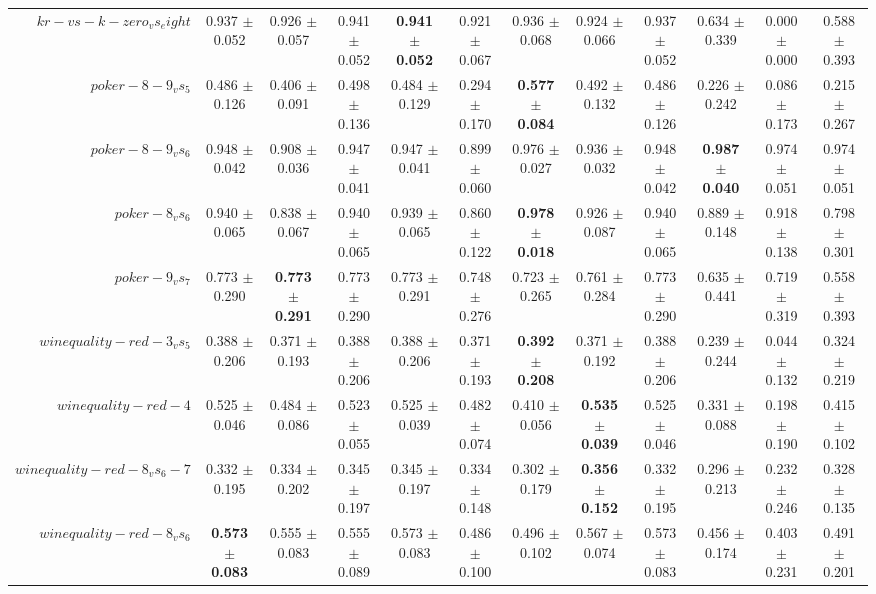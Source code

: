 \begin{table}[!ht]
{\begin{tabular}{r c c c c c c c c c c c}
$kr-vs-k-zero_vs_eight$ & 0.937 $\pm$ 0.052 & 0.926 $\pm$ 0.057 & 0.941 $\pm$ 0.052 & \textbf{0.941 $\pm$ 0.052} & 0.921 $\pm$ 0.067 & 0.936 $\pm$ 0.068 & 0.924 $\pm$ 0.066 & 0.937 $\pm$ 0.052 & 0.634 $\pm$ 0.339 & 0.000 $\pm$ 0.000 & 0.588 $\pm$ 0.393 \\
$poker-8-9_vs_5$ & 0.486 $\pm$ 0.126 & 0.406 $\pm$ 0.091 & 0.498 $\pm$ 0.136 & 0.484 $\pm$ 0.129 & 0.294 $\pm$ 0.170 & \textbf{0.577 $\pm$ 0.084} & 0.492 $\pm$ 0.132 & 0.486 $\pm$ 0.126 & 0.226 $\pm$ 0.242 & 0.086 $\pm$ 0.173 & 0.215 $\pm$ 0.267 \\
$poker-8-9_vs_6$ & 0.948 $\pm$ 0.042 & 0.908 $\pm$ 0.036 & 0.947 $\pm$ 0.041 & 0.947 $\pm$ 0.041 & 0.899 $\pm$ 0.060 & 0.976 $\pm$ 0.027 & 0.936 $\pm$ 0.032 & 0.948 $\pm$ 0.042 & \textbf{0.987 $\pm$ 0.040} & 0.974 $\pm$ 0.051 & 0.974 $\pm$ 0.051 \\
$poker-8_vs_6$ & 0.940 $\pm$ 0.065 & 0.838 $\pm$ 0.067 & 0.940 $\pm$ 0.065 & 0.939 $\pm$ 0.065 & 0.860 $\pm$ 0.122 & \textbf{0.978 $\pm$ 0.018} & 0.926 $\pm$ 0.087 & 0.940 $\pm$ 0.065 & 0.889 $\pm$ 0.148 & 0.918 $\pm$ 0.138 & 0.798 $\pm$ 0.301 \\
$poker-9_vs_7$ & 0.773 $\pm$ 0.290 & \textbf{0.773 $\pm$ 0.291} & 0.773 $\pm$ 0.290 & 0.773 $\pm$ 0.291 & 0.748 $\pm$ 0.276 & 0.723 $\pm$ 0.265 & 0.761 $\pm$ 0.284 & 0.773 $\pm$ 0.290 & 0.635 $\pm$ 0.441 & 0.719 $\pm$ 0.319 & 0.558 $\pm$ 0.393 \\
$winequality-red-3_vs_5$ & 0.388 $\pm$ 0.206 & 0.371 $\pm$ 0.193 & 0.388 $\pm$ 0.206 & 0.388 $\pm$ 0.206 & 0.371 $\pm$ 0.193 & \textbf{0.392 $\pm$ 0.208} & 0.371 $\pm$ 0.192 & 0.388 $\pm$ 0.206 & 0.239 $\pm$ 0.244 & 0.044 $\pm$ 0.132 & 0.324 $\pm$ 0.219 \\
$winequality-red-4$ & 0.525 $\pm$ 0.046 & 0.484 $\pm$ 0.086 & 0.523 $\pm$ 0.055 & 0.525 $\pm$ 0.039 & 0.482 $\pm$ 0.074 & 0.410 $\pm$ 0.056 & \textbf{0.535 $\pm$ 0.039} & 0.525 $\pm$ 0.046 & 0.331 $\pm$ 0.088 & 0.198 $\pm$ 0.190 & 0.415 $\pm$ 0.102 \\
$winequality-red-8_vs_6-7$ & 0.332 $\pm$ 0.195 & 0.334 $\pm$ 0.202 & 0.345 $\pm$ 0.197 & 0.345 $\pm$ 0.197 & 0.334 $\pm$ 0.148 & 0.302 $\pm$ 0.179 & \textbf{0.356 $\pm$ 0.152} & 0.332 $\pm$ 0.195 & 0.296 $\pm$ 0.213 & 0.232 $\pm$ 0.246 & 0.328 $\pm$ 0.135 \\
$winequality-red-8_vs_6$ & \textbf{0.573 $\pm$ 0.083} & 0.555 $\pm$ 0.083 & 0.555 $\pm$ 0.089 & 0.573 $\pm$ 0.083 & 0.486 $\pm$ 0.100 & 0.496 $\pm$ 0.102 & 0.567 $\pm$ 0.074 & 0.573 $\pm$ 0.083 & 0.456 $\pm$ 0.174 & 0.403 $\pm$ 0.231 & 0.491 $\pm$ 0.201 \\

\end{tabular}}
\end{table}
